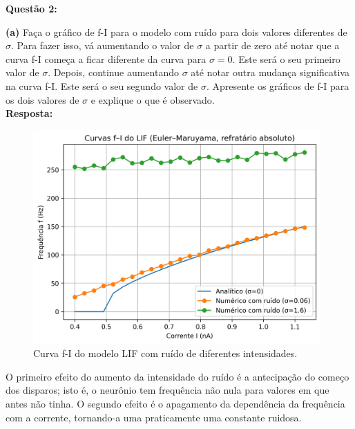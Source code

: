 \documentclass[english,11pt,a4paper]{article}
\begin{document}
	\noindent\textbf{Questão 2:}
	
	
	\noindent \textbf{(a)} Faça o gráfico de f-I para o modelo com ruído para dois valores diferentes de $\sigma$. Para fazer isso, vá aumentando o valor de $\sigma$ a partir de zero até notar que a curva f-I começa a ficar diferente da curva para $\sigma = 0$. Este será o seu primeiro valor de $\sigma$. Depois, continue aumentando $\sigma$ até notar outra mudança significativa na curva f-I. Este será o seu segundo valor de $\sigma$. Apresente os gráficos de f-I para os dois valores de $\sigma$ e explique o que é observado.
	\\
	
	\noindent\textbf{Resposta:}
	
	\begin{figure}[H]
		\centering
		\includegraphics[width=11cm]{../figures/ex_2a.png}
		\caption{Curva f-I do modelo LIF com ruído de diferentes intensidades.}
	\end{figure}
	
	O primeiro efeito do aumento da intensidade do ruído é a antecipação do começo dos disparos; isto é, o neurônio tem frequência não nula para valores em que antes não tinha. O segundo efeito é o apagamento da dependência da frequência com a corrente, tornando-a uma praticamente uma constante ruidosa.\\\\
	
\end{document}
